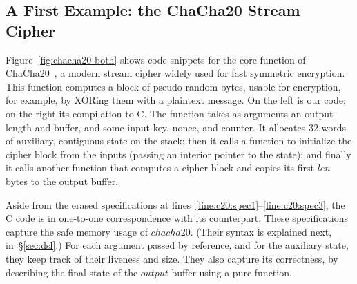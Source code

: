 \subsection{A First Example: the ChaCha20 Stream Cipher}
\label{sec:chacha20}



Figure~\ref{fig:chacha20-both} shows code snippets for the core
function of ChaCha20~\cite{chacha20}, a modern stream cipher widely
used for fast symmetric encryption.
%
This function computes a block of pseudo-random bytes, usable for
encryption, for example, by XORing them with a plaintext message.
%
%
On the left is our \lowstar code; on the right its compilation to
C. 
%
The function takes as arguments an output length and buffer, and some
input key, nonce, and counter. 
%
It allocates 32 words of auxiliary, contiguous state on the stack; then it calls a
function to initialize the cipher block from the inputs (passing an
interior pointer to the state); and finally it calls another function that
computes a cipher block and copies its first \lst$len$ bytes to the
output buffer.

Aside from the erased specifications at
lines~\ref{line:c20:spec1}--\ref{line:c20:spec3}, the C code is in
one-to-one correspondence with its \lowstar counterpart.
%
These specifications capture the safe memory usage of \lst$chacha20$.
(Their syntax is explained next, in~\S\ref{sec:dsl}.)
%
For each argument passed by reference, and for the auxiliary state,
they keep track of their liveness and size. They also capture its
correctness, by describing the final state of the \lst$output$ buffer
using a pure function.

